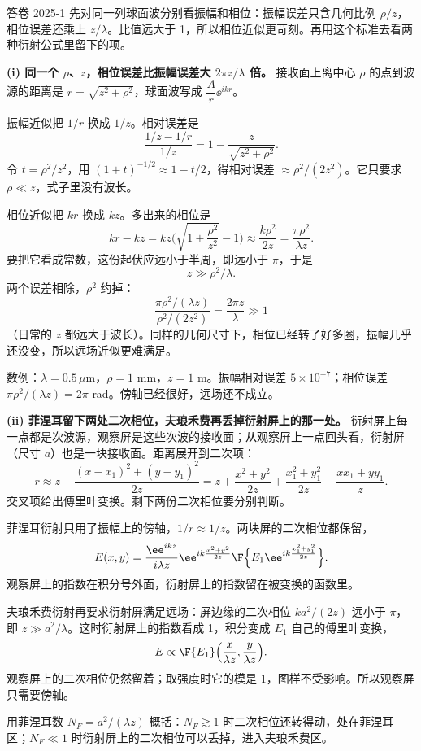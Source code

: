 \begin{exam}{答卷 2025-1}
先对同一列球面波分别看振幅和相位：振幅误差只含几何比例 $\rho/z$，相位误差还乘上 $z/\lambda$。比值远大于 1，所以相位近似更苛刻。再用这个标准去看两种衍射公式里留下的项。

\textbf{(i) 同一个 $\rho$、$z$，相位误差比振幅误差大 $2\pi z/\lambda$ 倍。}
接收面上离中心 $\rho$ 的点到波源的距离是 $r=\sqrt{z^2+\rho^2}$，球面波写成 $\dfrac{A}{r}\ee^{ikr}$。

振幅近似把 $1/r$ 换成 $1/z$。相对误差是
\[
\frac{1/z-1/r}{1/z}=1-\frac{z}{\sqrt{z^2+\rho^2}} .
\]
令 $t=\rho^2/z^2$，用 $(1+t)^{-1/2}\approx1-t/2$，得相对误差 $\approx\rho^2/(2z^2)$。它只要求 $\rho\ll z$，式子里没有波长。

相位近似把 $kr$ 换成 $kz$。多出来的相位是
\[
kr-kz=kz\Big(\sqrt{1+\frac{\rho^2}{z^2}}-1\Big)\approx\frac{k\rho^2}{2z}=\frac{\pi\rho^2}{\lambda z} .
\]
要把它看成常数，这份起伏应远小于半周，即远小于 $\pi$，于是
\[
\boxed{z\gg\rho^2/\lambda} .
\]
两个误差相除，$\rho^2$ 约掉：
\[
\frac{\pi\rho^2/(\lambda z)}{\rho^2/(2z^2)}=\frac{2\pi z}{\lambda}\gg1
\]
（日常的 $z$ 都远大于波长）。同样的几何尺寸下，相位已经转了好多圈，振幅几乎还没变，所以远场近似更难满足。

数例：$\lambda=0.5\,\mu$m，$\rho=1$ mm，$z=1$ m。振幅相对误差 $5\times10^{-7}$；相位误差 $\pi\rho^2/(\lambda z)=2\pi$ rad。傍轴已经很好，远场还不成立。

\textbf{(ii) 菲涅耳留下两处二次相位，夫琅禾费再丢掉衍射屏上的那一处。}
衍射屏上每一点都是次波源，观察屏是这些次波的接收面；从观察屏上一点回头看，衍射屏（尺寸 $a$）也是一块接收面。距离展开到二次项：
\[
r\approx z+\frac{(x-x_1)^2+(y-y_1)^2}{2z}
=z+\frac{x^2+y^2}{2z}+\frac{x_1^2+y_1^2}{2z}-\frac{xx_1+yy_1}{z} .
\]
交叉项给出傅里叶变换。剩下两份二次相位要分别判断。

菲涅耳衍射只用了振幅上的傍轴，$1/r\approx1/z$。两块屏的二次相位都保留，
\[
E(x,y)=\frac{\ee^{ikz}}{i\lambda z}\ee^{ik\frac{x^2+y^2}{2z}}
\F\Big\{E_1\ee^{ik\frac{x_1^2+y_1^2}{2z}}\Big\} .
\]
观察屏上的指数在积分号外面，衍射屏上的指数留在被变换的函数里。

夫琅禾费衍射再要求衍射屏满足远场：屏边缘的二次相位 $ka^2/(2z)$ 远小于 $\pi$，即 $z\gg a^2/\lambda$。这时衍射屏上的指数看成 1，积分变成 $E_1$ 自己的傅里叶变换，
\[
E\propto\F\{E_1\}\Big(\frac{x}{\lambda z},\frac{y}{\lambda z}\Big) .
\]
观察屏上的二次相位仍然留着；取强度时它的模是 1，图样不受影响。所以观察屏只需要傍轴。

用菲涅耳数 $N_F=a^2/(\lambda z)$ 概括：$N_F\gtrsim1$ 时二次相位还转得动，处在菲涅耳区；$N_F\ll1$ 时衍射屏上的二次相位可以丢掉，进入夫琅禾费区。
\end{exam}

